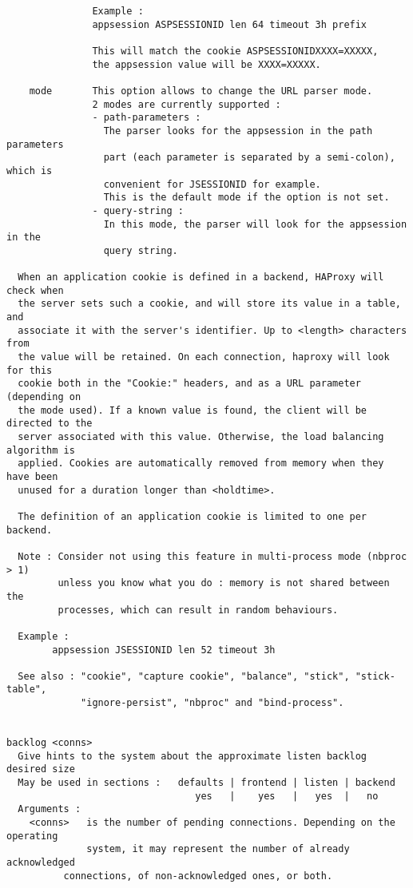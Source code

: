 \begin{verbatim}
               Example :
               appsession ASPSESSIONID len 64 timeout 3h prefix

               This will match the cookie ASPSESSIONIDXXXX=XXXXX,
               the appsession value will be XXXX=XXXXX.

    mode       This option allows to change the URL parser mode.
               2 modes are currently supported :
               - path-parameters :
                 The parser looks for the appsession in the path parameters
                 part (each parameter is separated by a semi-colon), which is
                 convenient for JSESSIONID for example.
                 This is the default mode if the option is not set.
               - query-string :
                 In this mode, the parser will look for the appsession in the
                 query string.

  When an application cookie is defined in a backend, HAProxy will check when
  the server sets such a cookie, and will store its value in a table, and
  associate it with the server's identifier. Up to <length> characters from
  the value will be retained. On each connection, haproxy will look for this
  cookie both in the "Cookie:" headers, and as a URL parameter (depending on
  the mode used). If a known value is found, the client will be directed to the
  server associated with this value. Otherwise, the load balancing algorithm is
  applied. Cookies are automatically removed from memory when they have been
  unused for a duration longer than <holdtime>.

  The definition of an application cookie is limited to one per backend.

  Note : Consider not using this feature in multi-process mode (nbproc > 1)
         unless you know what you do : memory is not shared between the
         processes, which can result in random behaviours.

  Example :
        appsession JSESSIONID len 52 timeout 3h

  See also : "cookie", "capture cookie", "balance", "stick", "stick-table",
             "ignore-persist", "nbproc" and "bind-process".


backlog <conns>
  Give hints to the system about the approximate listen backlog desired size
  May be used in sections :   defaults | frontend | listen | backend
                                 yes   |    yes   |   yes  |   no
  Arguments :
    <conns>   is the number of pending connections. Depending on the operating
              system, it may represent the number of already acknowledged
	      connections, of non-acknowledged ones, or both.


\end{verbatim}
